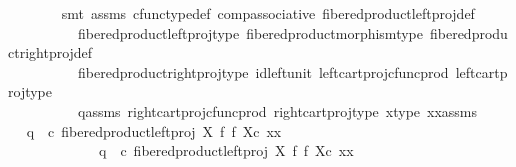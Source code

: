 \begin{isabellebody}
\ \ \ \ \ \ \isamarkupfalse%
\ {\isacharparenleft}{\kern0pt}smt\ assms{\isacharparenleft}{\kern0pt}{}{\isacharparenright}{\kern0pt}\ cfunc{\isacharunderscore}{\kern0pt}type{\isacharunderscore}{\kern0pt}def\ comp{\isacharunderscore}{\kern0pt}associative{}\ fibered{\isacharunderscore}{\kern0pt}product{\isacharunderscore}{\kern0pt}left{\isacharunderscore}{\kern0pt}proj{\isacharunderscore}{\kern0pt}def\isanewline
\ \ \ \ \ \ \ \ \ \ fibered{\isacharunderscore}{\kern0pt}product{\isacharunderscore}{\kern0pt}left{\isacharunderscore}{\kern0pt}proj{\isacharunderscore}{\kern0pt}type\ fibered{\isacharunderscore}{\kern0pt}product{\isacharunderscore}{\kern0pt}morphism{\isacharunderscore}{\kern0pt}type\ fibered{\isacharunderscore}{\kern0pt}product{\isacharunderscore}{\kern0pt}right{\isacharunderscore}{\kern0pt}proj{\isacharunderscore}{\kern0pt}def\isanewline
\ \ \ \ \ \ \ \ \ \ fibered{\isacharunderscore}{\kern0pt}product{\isacharunderscore}{\kern0pt}right{\isacharunderscore}{\kern0pt}proj{\isacharunderscore}{\kern0pt}type\ id{\isacharunderscore}{\kern0pt}left{\isacharunderscore}{\kern0pt}unit{}\ left{\isacharunderscore}{\kern0pt}cart{\isacharunderscore}{\kern0pt}proj{\isacharunderscore}{\kern0pt}cfunc{\isacharunderscore}{\kern0pt}prod\ left{\isacharunderscore}{\kern0pt}cart{\isacharunderscore}{\kern0pt}proj{\isacharunderscore}{\kern0pt}type\isanewline
\ \ \ \ \ \ \ \ \ \ q{}{\isacharunderscore}{\kern0pt}assms\ right{\isacharunderscore}{\kern0pt}cart{\isacharunderscore}{\kern0pt}proj{\isacharunderscore}{\kern0pt}cfunc{\isacharunderscore}{\kern0pt}prod\ right{\isacharunderscore}{\kern0pt}cart{\isacharunderscore}{\kern0pt}proj{\isacharunderscore}{\kern0pt}type\ x{\isacharunderscore}{\kern0pt}type\ xx{\isacharunderscore}{\kern0pt}assms{\isacharparenright}{\kern0pt}\isanewline
\ \ \ \ \isamarkupfalse%
\ \isamarkupfalse%
\ {\isachardoublequoteopen}q{}\ \ {\isasymcirc}\isactrlsub c\ {\isacharparenleft}{\kern0pt}{\isacharparenleft}{\kern0pt}fibered{\isacharunderscore}{\kern0pt}product{\isacharunderscore}{\kern0pt}left{\isacharunderscore}{\kern0pt}proj\ X\ f\ f\ X{\isacharparenright}{\kern0pt}{\isasymcirc}\isactrlsub c\ xx{\isacharparenright}{\kern0pt}\ {\isacharequal}{\kern0pt}\ \isanewline
\ \ \ \ \ \ \ \ \ \ \ \ \ q{}\ \ {\isasymcirc}\isactrlsub c\ {\isacharparenleft}{\kern0pt}{\isacharparenleft}{\kern0pt}fibered{\isacharunderscore}{\kern0pt}product{\isacharunderscore}{\kern0pt}left{\isacharunderscore}{\kern0pt}proj\ X\ f\ f\ X{\isacharparenright}{\kern0pt}{\isasymcirc}\isactrlsub c\ xx{\isacharparenright}{\kern0pt}{\isachardoublequoteclose}\isanewline

\end{isabellebody}
